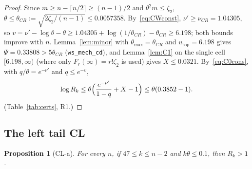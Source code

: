 \documentclass[11pt]{amsart}
\newcommand{\script}[1]{\texttt{#1}}
\newtheorem{proposition}[theorem]{Proposition}
\theoremstyle{definition}
\theoremstyle{remark}
\numberwithin{equation}{section}
\begin{document}
\begin{proof}
Since $m\ge n-\lceil n/2\rceil\ge(n-1)/2$ and $\theta^2m\le\zeta_2$, $\theta\le\theta_{CR}:=\sqrt{2\zeta_2/(n-1)}\le0.0057358$. By~\eqref{eq:CWconst},
$\nu'\ge\nu_{CR}=1.04305$, so $v=\nu'-\log\theta-\theta\ge1.04305+\log(1/\theta_{CR})-\theta_{CR}\ge6.198$; both bounds improve with $n$.
Lemma~\ref{lem:minor} with $\theta_{\max}=\theta_{CR}$ and $u_{\mathrm{top}}=6.198$ gives $\Psi=0.33808>5\theta_{CR}$ (\script{ws\_mech\_cd}), and Lemma~\ref{lem:C1} on the single cell
$[6.198,\infty)$ (where only $F_r(\infty)=r!\zeta_2$ is used) gives $X\le0.0321$. By~\eqref{eq:C0cons}, with $q/\theta=e^{-\nu'}$ and $q\le e^{-v}$,
\[
  \log R_k\le\theta\Bigl(\frac{e^{-\nu'}}{1-q}+X-1\Bigr)\le\theta(0.3852-1).
\]
(Table~\ref{tab:certs}, R1.)
\end{proof}

\subsection{The left tail CL}
\begin{proposition}[CL-a]\label{prop:CLa}
For every $n$, if $47\le k\le n-2$ and $k\theta\le0.1$, then $R_k>1$.
\end{proposition}
\end{document}
